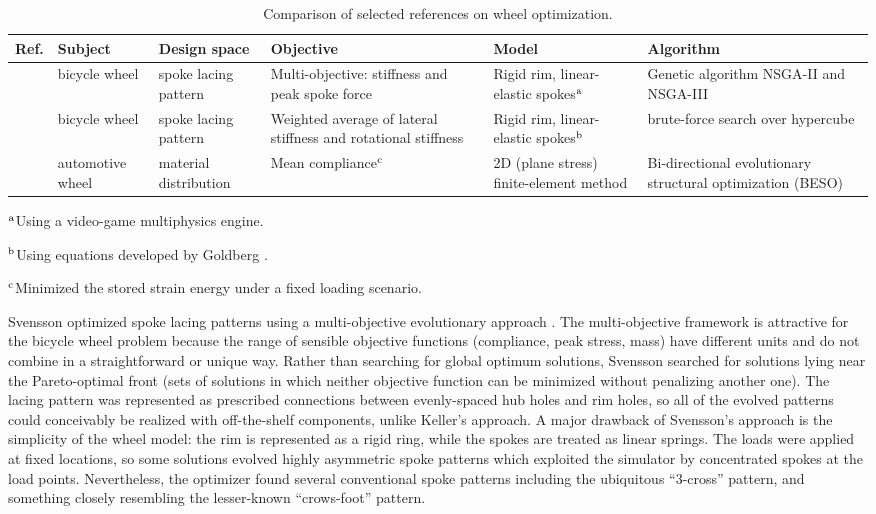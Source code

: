 \documentclass[\rootdir/thesis.tex]{subfiles}
\begin{document}
\begin{table}
\caption{Comparison of selected references on wheel optimization.}
\begin{tabularx}{\textwidth}{l L L L L L}
\hline
\bf Ref. & \bf Subject & \bf Design space & \bf Objective & \bf Model & \bf Algorithm\\
\hline
\cite{Svensson2015} & bicycle wheel    & spoke lacing pattern  & Multi-objective: stiffness and peak spoke force &
	Rigid rim, linear-elastic spokes$^{\rm a}$ & Genetic algorithm NSGA-II and NSGA-III \cite{Deb2002,Deb2014}\\

\cite{Keller2013}   & bicycle wheel    & spoke lacing pattern  & Weighted average of lateral stiffness and rotational stiffness &
	Rigid rim, linear-elastic spokes$^{\rm b}$ & brute-force search over hypercube\\

\cite{Zuo2011}      & automotive wheel & material distribution & Mean compliance$^{\rm c}$ &
	2D (plane stress) finite-element method & Bi-directional evolutionary structural optimization (BESO) \cite{Huang2007}\\
\hline
\end{tabularx}
\raggedright{$^{\rm a}$Using a video-game multiphysics engine.}\\
\raggedright{$^{\rm b}$Using equations developed by Goldberg \cite{Goldberg1984}.}\\
\raggedright{$^{\rm c}$Minimized the stored strain energy under a fixed loading scenario.}
\end{table}

Svensson optimized spoke lacing patterns using a multi-objective evolutionary approach \cite{Svensson2015}. The multi-objective framework is attractive for the bicycle wheel problem because the range of sensible objective functions (compliance, peak stress, mass) have different units and do not combine in a straightforward or unique way. Rather than searching for global optimum solutions, Svensson searched for solutions lying near the Pareto-optimal front (sets of solutions in which neither objective function can be minimized without penalizing another one). The lacing pattern was represented as prescribed connections between evenly-spaced hub holes and rim holes, so all of the evolved patterns could conceivably be realized with off-the-shelf components, unlike Keller's approach. A major drawback of Svensson's approach is the simplicity of the wheel model: the rim is represented as a rigid ring, while the spokes are treated as linear springs. The loads were applied at fixed locations, so some solutions evolved highly asymmetric spoke patterns which exploited the simulator by concentrated spokes at the load points. Nevertheless, the optimizer found several conventional spoke patterns including the ubiquitous ``3-cross'' pattern, and something closely resembling the lesser-known ``crows-foot'' pattern.
\end{document}
